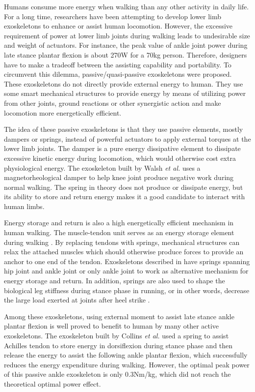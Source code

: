 \documentclass[twocolumn,cleanfoot,10pt]{asme2ej}
\begin{document}
Humans consume more energy when walking than any other activity in daily life. For a long time, researchers have been attempting to develop lower limb exoskeletons to enhance or assist human locomotion. However, the excessive requirement of power at lower limb joints during walking leads to undesirable size and weight of actuators\cite{RN1}. For instance, the peak value of ankle joint power during late stance plantar flexion is about 270W for a 70kg person\cite{RN2}. Therefore, designers have to make a tradeoff between the assisting capability and portability. To circumvent this dilemma, passive/quasi-passive exoskeletons were proposed\cite{RN3}. These exoskeletons do not directly provide external energy to human. They use some smart mechanical structures to provide energy by means of utilizing power from other joints, ground reactions or other synergistic action and make locomotion more energetically efficient. 

The idea of these passive exoskeletons is that they use passive elements, mostly dampers or springs, instead of powerful actuators to apply external torques at the lower limb joints. The damper is a pure energy dissipative element to dissipate excessive kinetic energy during locomotion, which would otherwise cost extra physiological energy\cite{negativework}. The exoskeleton built by Walsh \emph{et al.} uses a magnetorheological damper to help knee joint produce negative work during normal walking\cite{RN3}. The spring in theory does not produce or dissipate energy, but its ability to store and return energy makes it a good candidate to interact with human limbs. 

Energy storage and return is also a high energetically efficient mechanism in human walking. The muscle-tendon unit serves as an energy storage element during walking \cite{RN16}\cite{pays}. By replacing tendons with springs, mechanical structures can relax the attached muscles which should otherwise produce forces to provide an anchor to one end of the tendon. Exoskeletons described in \cite{RN3}\cite{RN4}\cite{RN5} have springs spanning hip joint and ankle joint or only ankle joint to work as alternative mechanism for energy storage and return. In addition, springs are also used to shape the biological leg stiffness during stance phase in running, or in other words, decrease the large load exerted at joints after heel strike \cite{RN6,RN7,RN8}.

Among these exoskeletons, using external moment to assist late stance ankle plantar flexion is well proved to benefit to human by many other active exoskeletons\cite{RN5,RN9,RN10,RN11,RN12}. The exoskeleton built by Collins \emph{et al.}\cite{RN5} used a spring to assist Achilles tendon to store energy in dorsiflexion during stance phase and then release the energy to assist the following ankle plantar flexion, which successfully reduces the energy expenditure during walking.  However, the optimal peak power of this passive ankle exoskeleton \cite{RN5} is only 0.3Nm/kg, which did not reach the theoretical optimal power effect\cite{zhang2017human}.
\end{document}
